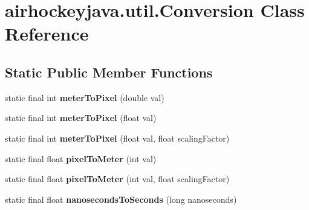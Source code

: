 \hypertarget{classairhockeyjava_1_1util_1_1_conversion}{}\section{airhockeyjava.\+util.\+Conversion Class Reference}
\label{classairhockeyjava_1_1util_1_1_conversion}
\subsection*{Static Public Member Functions}
\begin{DoxyCompactItemize}
\item 
\hypertarget{classairhockeyjava_1_1util_1_1_conversion_ae3a85fdaeb7018a3705412cf5bbe3d82}{}static final int {\bfseries meter\+To\+Pixel} (double val)\label{classairhockeyjava_1_1util_1_1_conversion_ae3a85fdaeb7018a3705412cf5bbe3d82}

\item 
\hypertarget{classairhockeyjava_1_1util_1_1_conversion_a0e98790cfc3a58a42dd8385ea363c000}{}static final int {\bfseries meter\+To\+Pixel} (float val)\label{classairhockeyjava_1_1util_1_1_conversion_a0e98790cfc3a58a42dd8385ea363c000}

\item 
\hypertarget{classairhockeyjava_1_1util_1_1_conversion_a62ffff92479ea21d2e7ca9fb83bb596c}{}static final int {\bfseries meter\+To\+Pixel} (float val, float scaling\+Factor)\label{classairhockeyjava_1_1util_1_1_conversion_a62ffff92479ea21d2e7ca9fb83bb596c}

\item 
\hypertarget{classairhockeyjava_1_1util_1_1_conversion_a19af9f657a3be7c4e4d11124595a7a8c}{}static final float {\bfseries pixel\+To\+Meter} (int val)\label{classairhockeyjava_1_1util_1_1_conversion_a19af9f657a3be7c4e4d11124595a7a8c}

\item 
\hypertarget{classairhockeyjava_1_1util_1_1_conversion_aeeaf8d2af670876300369d9190593ebd}{}static final float {\bfseries pixel\+To\+Meter} (int val, float scaling\+Factor)\label{classairhockeyjava_1_1util_1_1_conversion_aeeaf8d2af670876300369d9190593ebd}

\item 
\hypertarget{classairhockeyjava_1_1util_1_1_conversion_a12d655c808ff7159525a769715570b7b}{}static final float {\bfseries nanoseconds\+To\+Seconds} (long nanoseconds)\label{classairhockeyjava_1_1util_1_1_conversion_a12d655c808ff7159525a769715570b7b}


\end{DoxyCompactItemize}
